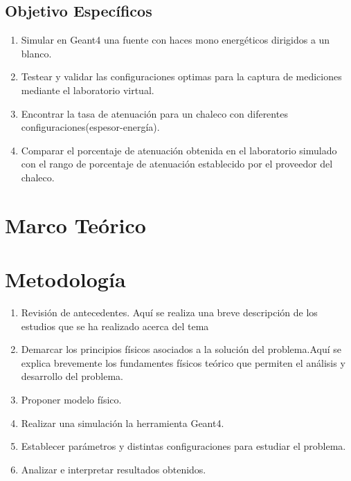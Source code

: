 \documentclass[a4paper,10pt]{article}
\begin{document}
\subsection{Objetivo Específicos}
\begin{enumerate}         
\item Simular en Geant4  una fuente con haces mono energéticos dirigidos a un blanco.
\item Testear y validar las configuraciones optimas para la captura de mediciones mediante el laboratorio virtual.

\item Encontrar la tasa de atenuación para un chaleco con diferentes configuraciones(espesor-energía).

\item Comparar el porcentaje de atenuación obtenida en el laboratorio simulado con el rango de porcentaje de atenuación establecido por el proveedor del chaleco. 
\end{enumerate}


\section{Marco Teórico}


\section{Metodología}



\begin{enumerate} 
 \item Revisión de antecedentes. 
 Aquí se realiza una breve descripción de los estudios que se ha realizado acerca del tema
 \item Demarcar los principios físicos asociados a la solución del problema.Aquí se explica brevemente los fundamentes físicos teórico que permiten el análisis y desarrollo del problema.
 \item Proponer modelo físico.
 \item Realizar una simulación la herramienta Geant4.
 \item Establecer parámetros y distintas configuraciones para estudiar el problema. 
 \item Analizar e interpretar resultados obtenidos.
 \end{enumerate} 
\end{document}
